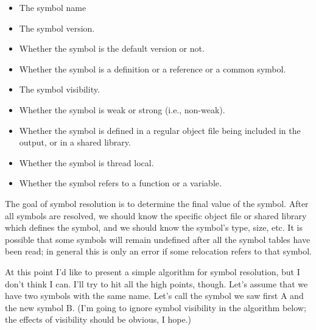 \begin{itemize}
    \item The symbol name

    \item The symbol version.

    \item Whether the symbol is the default version or not.

    \item Whether the symbol is a definition or a reference or a common symbol.

    \item The symbol visibility.

    \item Whether the symbol is weak or strong (i.e., non-weak).

    \item Whether the symbol is defined in a regular object file being included
          in the output, or in a shared library.

    \item Whether the symbol is thread local.

    \item Whether the symbol refers to a function or a variable.
\end{itemize}

The goal of symbol resolution is to determine the final value of the symbol.
After all symbols are resolved, we should know the specific object file or
shared library which defines the symbol, and we should know the symbol's type,
size, etc. It is possible that some symbols will remain undefined after all
the symbol tables have been read; in general this is only an error if some
relocation refers to that symbol.

At this point I'd like to present a simple algorithm for symbol resolution, but
I don't think I can. I'll try to hit all the high points, though. Let's assume
that we have two symbols with the same name. Let's call the symbol we saw first
A and the new symbol B. (I'm going to ignore symbol visibility in the algorithm
below; the effects of visibility should be obvious, I hope.)


